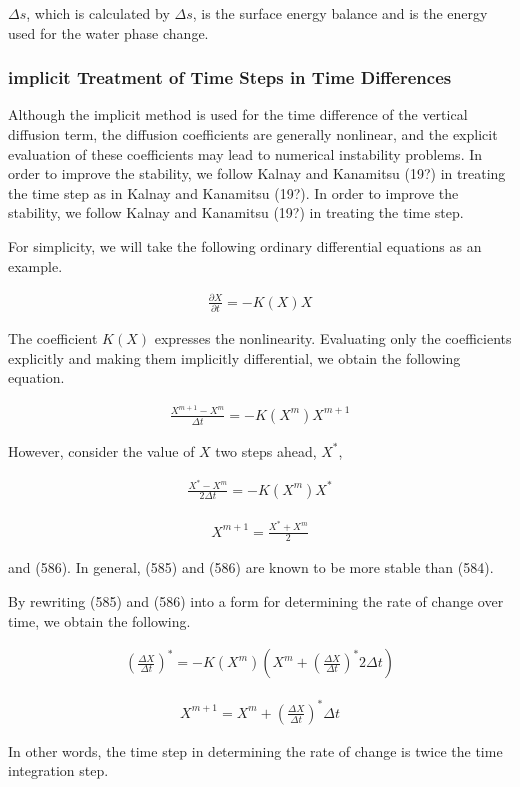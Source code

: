 \(\Delta s\), which is calculated by \(\Delta s\), is the surface energy balance and is the energy used for the water phase change.

\hypertarget{implicit-treatment-of-time-steps-in-time-differences}{%
\subsubsection{implicit Treatment of Time Steps in Time Differences}\label{implicit-treatment-of-time-steps-in-time-differences}}

Although the implicit method is used for the time difference of the vertical diffusion term, the diffusion coefficients are generally nonlinear, and the explicit evaluation of these coefficients may
lead to numerical instability problems. In order to improve the stability, we follow Kalnay and Kanamitsu (19?) in treating the time step as in Kalnay and Kanamitsu (19?). In order to improve the
stability, we follow Kalnay and Kanamitsu (19?) in treating the time step.

For simplicity, we will take the following ordinary differential equations as an example.

\begin{eqnarray}
  \frac{\partial{X}}{\partial {t}} = - K(X) X
\end{eqnarray}

The coefficient \(K(X)\) expresses the nonlinearity. Evaluating only the coefficients explicitly and making them implicitly differential, we obtain the following equation.

\begin{eqnarray}
  \frac{X^{m+1} - X^m}{\Delta t} = - K( X^m ) X^{m+1}
\end{eqnarray}

However, consider the value of \(X\) two steps ahead, \(X^{\ast}\),

\begin{eqnarray}
  \frac{X^{\ast} - X^m}{2\Delta t} = - K ( X^m ) X^{\ast}
\end{eqnarray}

\begin{eqnarray}
  X^{m+1} = \frac{X^{\ast} + X^m}2
\end{eqnarray}

and (586). In general, (585) and (586) are known to be more stable than (584).

By rewriting (585) and (586) into a form for determining the rate of change over time, we obtain the following.

\begin{eqnarray}
  \left(\frac{\Delta X}{\Delta t}\right)^{\ast} =
     - K( X^m ) \left( X^m +
        \left(\frac{\Delta X}{\Delta t}\right)^{\ast}
        2 \Delta t \right)
\end{eqnarray}

\begin{eqnarray}
  X^{m+1} = X^m + \left(\frac{\Delta X}{\Delta t}\right)^{\ast} \Delta t
\end{eqnarray}

In other words, the time step in determining the rate of change is twice the time integration step.
